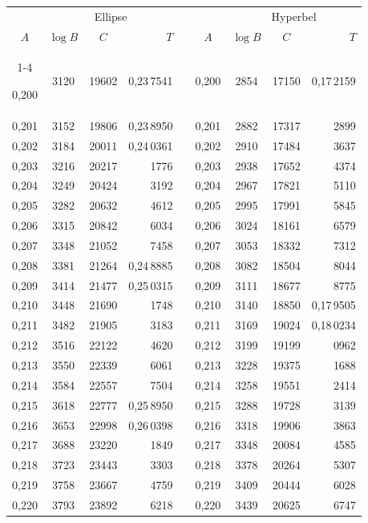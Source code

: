 \begin{tabular}{|c|c|c|r|@{}p{9pt}@{}|c|c|c|r|}
\hline
\rule{0pt}{8.5pt} & \multicolumn{3}{c|}{Ellipse} & & & \multicolumn{3}{c|}{Hyperbel} \\
\(A\) & \(\log B\) & \(C\) & \(T\) & & \(A\) & \(\log B\) & \(C\) & \(T\) \\
\cline{1-4}\cline{6-9}
\rule{0pt}{8.5pt}0,200 & 3120 & 19602 & 0,23\,7541 &  & 0,200 & 2854 & 17150 & 0,17\,2159 \\
0,201 & 3152 & 19806 & 0,23\,8950 &  & 0,201 & 2882 & 17317 & 2899 \\
0,202 & 3184 & 20011 & 0,24\,0361 &  & 0,202 & 2910 & 17484 & 3637 \\
0,203 & 3216 & 20217 & 1776 &  & 0,203 & 2938 & 17652 & 4374 \\
0,204 & 3249 & 20424 & 3192 &  & 0,204 & 2967 & 17821 & 5110 \\
0,205 & 3282 & 20632 & 4612 &  & 0,205 & 2995 & 17991 & 5845 \\[3pt]
0,206 & 3315 & 20842 & 6034 &  & 0,206 & 3024 & 18161 & 6579 \\
0,207 & 3348 & 21052 & 7458 &  & 0,207 & 3053 & 18332 & 7312 \\
0,208 & 3381 & 21264 & 0,24\,8885 &  & 0,208 & 3082 & 18504 & 8044 \\
0,209 & 3414 & 21477 & 0,25\,0315 &  & 0,209 & 3111 & 18677 & 8775 \\
0,210 & 3448 & 21690 & 1748 &  & 0,210 & 3140 & 18850 & 0,17\,9505 \\[3pt]
0,211 & 3482 & 21905 & 3183 &  & 0,211 & 3169 & 19024 & 0,18\,0234 \\
0,212 & 3516 & 22122 & 4620 &  & 0,212 & 3199 & 19199 & 0962 \\
0,213 & 3550 & 22339 & 6061 &  & 0,213 & 3228 & 19375 & 1688 \\
0,214 & 3584 & 22557 & 7504 &  & 0,214 & 3258 & 19551 & 2414 \\
0,215 & 3618 & 22777 & 0,25\,8950 &  & 0,215 & 3288 & 19728 & 3139 \\[3pt]
0,216 & 3653 & 22998 & 0,26\,0398 &  & 0,216 & 3318 & 19906 & 3863 \\
0,217 & 3688 & 23220 & 1849 &  & 0,217 & 3348 & 20084 & 4585 \\
0,218 & 3723 & 23443 & 3303 &  & 0,218 & 3378 & 20264 & 5307 \\
0,219 & 3758 & 23667 & 4759 &  & 0,219 & 3409 & 20444 & 6028 \\
0,220 & 3793 & 23892 & 6218 &  & 0,220 & 3439 & 20625 & 6747 \\[3pt]

\end{tabular}
